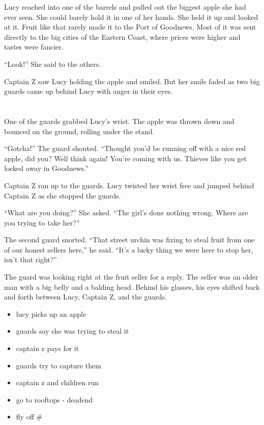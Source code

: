 \documentclass[12pt]{extbook}
\begin{document}
  Lucy reached into one of the barrels and pulled out the biggest apple
  she had ever seen. She could barely hold it in one of her hands. She
  held it up and looked at it. Fruit like that rarely made it to the Port
  of Goodnews. Most of it was sent directly to the big cities of the
  Eastern Coast, where prices were higher and tastes were fancier.
  
  \enquote{Look!} She said to the others.
  
  Captain Z saw Lucy holding the apple and smiled. But her smile faded as
  two big guards came up behind Lucy with anger in their eyes.
  
  \section{}\label{section-31}
  
  One of the guards grabbed Lucy's wrist. The apple was thrown down and
  bounced on the ground, rolling under the stand.
  
  \enquote{Gotcha!} The guard shouted. \enquote{Thought you'd be running
  off with a nice red apple, did you? Well think again! You're coming with
  us. Thieves like you get locked away in Goodnews.}
  
  Captain Z ran up to the guards. Lucy twisted her wrist free and jumped
  behind Captain Z as she stopped the guards.
  
  \enquote{What are you doing?} She asked. \enquote{The girl's done
  nothing wrong. Where are you trying to take her?}
  
  The second guard snorted. \enquote{That street urchin was fixing to
  steal fruit from one of our honest sellers here,} he said. \enquote{It's
  a lucky thing we were here to stop her, isn't that right?}
  
  The guard was looking right at the fruit seller for a reply. The seller
  was an older man with a big belly and a balding head. Behind his
  glasses, his eyes shifted back and forth between Lucy, Captain Z, and
  the guards.
  
  \begin{itemize}
  \itemsep1pt\parskip0pt
  \item
    lucy picks up an apple
  \item
    guards say she was trying to steal it
  \item
    captain z pays for it
  \item
    guards try to capture them
  \item
    captain z and children run
  \item
    go to rooftops - deadend
  \item
    fly off \#
  \end{itemize}
  
\end{document}
